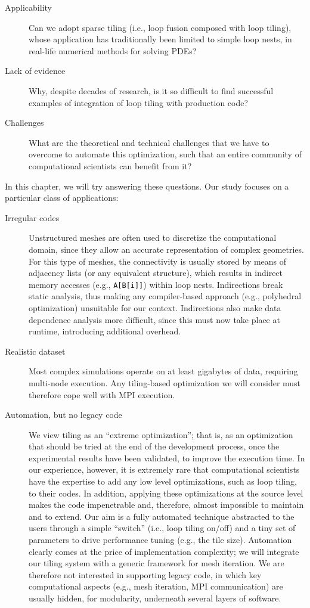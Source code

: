 \begin{description}
\item[Applicability] Can we adopt sparse tiling (i.e., loop fusion composed with loop tiling), whose application has traditionally been limited to simple loop nests, in real-life numerical methods for solving PDEs?
\item[Lack of evidence] Why, despite decades of research, is it so difficult to find successful examples of integration of loop tiling with production code? 
\item[Challenges] What are the theoretical and technical challenges that we have to overcome to automate this optimization, such that an entire community of computational scientists can benefit from it?
\end{description}

In this chapter, we will try answering these questions. Our study focuses on a particular class of applications:
\begin{description}
\item[Irregular codes] Unstructured meshes are often used to discretize the computational domain, since they allow an accurate representation of complex geometries. For this type of meshes, the connectivity is usually stored by means of adjacency lists (or any equivalent structure), which results in indirect memory accesses (e.g., \texttt{A[B[i]]}) within loop nests. Indirections break static analysis, thus making any compiler-based approach (e.g., polyhedral optimization) unsuitable for our context. Indirections also make data dependence analysis more difficult, since this must now take place at runtime, introducing additional overhead.
\item[Realistic dataset] Most complex simulations operate on at least gigabytes of data, requiring multi-node execution. Any tiling-based optimization we will consider must therefore cope well with MPI execution.
\item[Automation, but no legacy code] We view tiling as an ``extreme optimization''; that is, as an optimization that should be tried at the end of the development process, once the experimental results have been validated, to improve the execution time. In our experience, however, it is extremely rare that computational scientists have the expertise to add any low level optimizations, such as loop tiling, to their codes. In addition, applying these optimizations at the source level makes the code impenetrable and, therefore, almost impossible to maintain and to extend. Our aim is a fully automated technique abstracted to the users through a simple ``switch'' (i.e., loop tiling on/off) and a tiny set of parameters to drive performance tuning (e.g., the tile size). Automation clearly comes at the price of implementation complexity; we will integrate our tiling system with a generic framework for mesh iteration. We are therefore not interested in supporting legacy code, in which key computational aspects (e.g., mesh iteration, MPI communication) are usually hidden, for modularity, underneath several layers of software.
\end{description}

